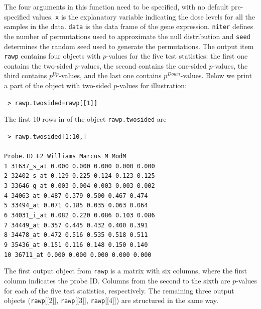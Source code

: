 The four arguments in this function need to be specified, with no
default pre-specified values. \texttt{x} is the explanatory variable
indicating the dose levels for all the samples in the data.
\texttt{data} is the data frame of the gene expression.
\texttt{niter} defines the number of permutations used to
approximate the null distribution and \texttt{seed} determines the
random seed used to generate the permutations. The output item
\texttt{rawp} contains four objects with $p$-values for the five
test statistics: the first one contains the two-sided $p$-values,
the second contains the one-sided $p$-values, the third contains
$p^{Up}$-values, and the last one contains $p^{Down}$-values. Below
we print a part of the object with two-sided $p$-values for illustration:
\begin{center}
\begin{boxit}
\texttt{
> rawp.twosided=rawp[[1]]}
\end{boxit}
\end{center}
The first 10 rows in of the object \texttt{rawp.twosided} are
\begin{center}
\begin{boxit}
\texttt{
> rawp.twosided[1:10,]\\\\
   Probe.ID      E2  Williams  Marcus  M   ModM\\
1  31637\_s\_at 0.000 0.000  0.000 0.000 0.000\\
2  32402\_s\_at 0.129 0.225  0.124 0.123 0.125 \\
3  33646\_g\_at 0.003 0.004  0.003 0.003 0.002\\
4  34063\_at    0.487 0.379  0.500 0.467 0.474\\
5  33494\_at    0.071 0.185  0.035 0.063 0.064\\
6  34031\_i\_at 0.082 0.220  0.086 0.103 0.086\\
7  34449\_at    0.357 0.445  0.432 0.400 0.391\\
8  34478\_at    0.472 0.516  0.535 0.518 0.511\\
9  35436\_at    0.151 0.116  0.148 0.150 0.140 \\
10 36711\_at    0.000 0.000  0.000 0.000 0.000 \\}
\end{boxit}
\end{center}
The first output object from \texttt{rawp} is a matrix with six
columns, where the first column indicates the probe ID. Columns from
the second to the sixth are $p$-values for each of the five test
statistics, respectively. The remaining three output objects
(\texttt{rawp}[[2]], \texttt{rawp}[[3]], \texttt{rawp}[[4]]) are
structured in the same way.


